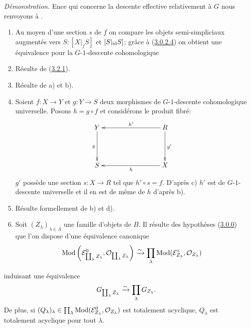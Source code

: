 \documentclass[10pt]{../fichiers-configuration-latex/smfart}
\begin{document}
\noindent\emph{Démonstration.}
En\pageoriginale ce qui concerne la descente effective relativement à
$G$ nous renvoyons à \cite{SGA4-05bis:4}.
\begin{enumerate}
\renewcommand{\theenumi}{\alph {enumi}}
\renewcommand{\labelenumi}{\theenumi)}
\item Au moyen d'une section $s$ de $f$ on compare les objets
  semi-simpliciaux augmentés vers $S : [X |_f S]$ et $[S|_{\operatorname{id}} S]$;
  grâce à (\hyperref[Vbis.lem3.0.2.4]{3.0.2.4}) on obtient une équivalence pour la $G$-$1$-descente
  cohomologique

\item Résulte de (\hyperref[Vbis.prop3.2.1]{3.2.1}).

\item Résulte de a) et b).

\item Soient $f : X \to Y$ et $g : Y \to S$ deux morphismes de
  $G$-$1$-descente cohomologique universelle. Posons $h = g \circ f$ et
  considérons le produit fibré:
\[
\xymatrix@C=3cm@R=1.5cm{
Y  \ar[d]_{g}& R\ar[d]^{g'} \ar[l]_{h'}\\
S & X \ar[l]^{h}
}
\]
$g'$ possède une section $s : X \to R$ tel que $h' \circ s =
f$. D'après c) $h'$ est de $G$-$1$-descente universelle et il en est de
même de $h$ d'après b).

\item Résulte formellement de b) et d).

\item Soit $(Z_{\lambda})_{\lambda \in \Lambda}$ une famille d'objets
  de $B$. Il résulte des hypothèses (\hyperref[Vbis.subsubsec3.0.0]{3.0.0}) que l'on dispose d'une
  équivalence canonique
$$
\operatorname{Mod} \left(\mathcal{E}^0_{\coprod_{\lambda} Z_{\lambda}},
\mathcal{O}_{\coprod_{\lambda} Z_{\lambda}}
\right) \xrightarrow{\sim} \displaystyle\mathop{\prod}_{\lambda}
\operatorname{Mod}(\mathcal{E}^{\circ}_{Z_\lambda}, \mathcal{O}_{Z_\lambda})
$$
\end{enumerate}
induisant une équivalence
$$
G_{\coprod_{\lambda} Z_{\lambda}}
\xrightarrow{\sim} \prod_{\lambda} G_{Z_{\lambda}}{}.
$$
De plus, si $(Q_{\lambda})_{\lambda} \in
\prod_{\lambda} \operatorname{Mod}(\mathcal{E}^0_{Z_\lambda},
\mathcal{O}_{Z_\lambda})$ est totalement acyclique, $Q_{\lambda}$ est
totalement acyclique pour tout $\lambda$.
\end{document}
